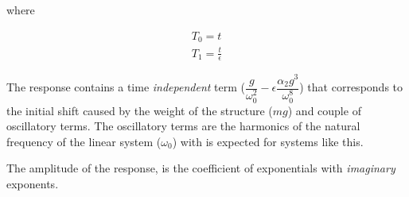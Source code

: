 where

%
\begin{align*}
	T_0 = t \\
	T_1 = \frac{t}{\epsilon}
\end{align*}
%

The response contains a time \emph{independent} term ($\dfrac{g}{\omega_0^2} - \epsilon \dfrac{\alpha_2 g^3}{\omega_0^8}$) that corresponds to the initial shift caused by the weight of the structure ($mg$) and couple of oscillatory terms. The oscillatory terms are the harmonics of the natural frequency of the linear system ($\omega_0$) with is expected for systems like this.

The amplitude of the response, is the coefficient of exponentials with \emph{imaginary} exponents.